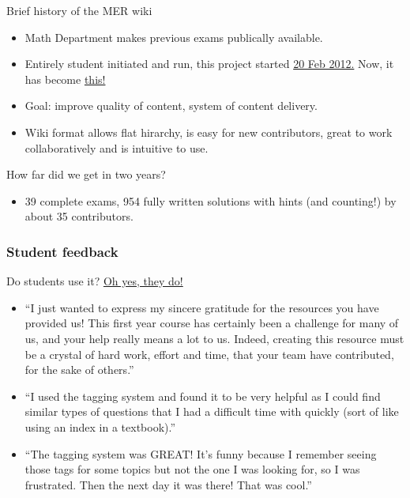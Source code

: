 \documentclass{beamer}
\begin{document}
\frame
{
  \begin{block}{Brief history of the MER wiki}

      \begin{itemize}
                \item Math Department makes previous exams publically available.
				\item Entirely student initiated and run, this project started \href{http://wiki.ubc.ca/index.php?title=Science:Math_Exam_Resources&oldid=139951}{20 Feb 2012.} Now, it has become \href{http://wiki.ubc.ca/Science:Math_Exam_Resources}{this!}

                \item Goal: improve quality of content, system of content delivery.

				\item Wiki format allows flat hirarchy, is easy for new contributors, great to work collaboratively and is intuitive to use.
      \end{itemize}
    \end{block}

    \begin{block}{How far did we get in two years?}
        \begin{itemize}
            \item 39 complete exams, 954 fully written solutions with hints (and counting!) by about 35 contributors.

         \end{itemize}
      \end{block}
}

\frame
{
    \frametitle{Student feedback}
Do students use it? \href{http://htmlpreview.github.io/?https://github.com/MER-wiki/google-analytics/blob/master/presentations/2014-02-13_Lunch_Series/output-hidden.html}{Oh yes, they do!}

\begin{itemize}
\item ``I just wanted to express my sincere gratitude for the resources you have provided us! This first year course has certainly been a challenge for many of us, and your help really means a lot to us. Indeed, creating this resource must be a crystal of hard work, effort
and time, that your team have contributed, for the sake of others.''
\item ``I used the tagging system and found it to be very helpful as I could find similar types of questions that I had a difficult time with quickly (sort of like using an index in a textbook).''
\item ``The tagging system was GREAT! It's funny because I remember seeing those tags for some topics but not the one I was looking for, so I was frustrated. Then the next day it was there! That was cool.''
\end{itemize}

}
\end{document}
